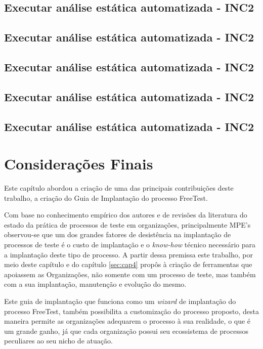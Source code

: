 \subsection{Executar análise estática automatizada - INC2}


\subsection{Executar análise estática automatizada - INC2}

\subsection{Executar análise estática automatizada - INC2}

\subsection{Executar análise estática automatizada - INC2}

\subsection{Executar análise estática automatizada - INC2}

\section{Considerações Finais}
\label{sec:consideracoesfinaisguiaimplantacao}

Este capítulo abordou a criação de uma das principais contribuições deste trabalho, a criação do Guia de Implantação do processo FreeTest. 

Com base no conhecimento empírico dos autores e de revisões da literatura do estado da prática de processos de teste em organizações, principalmente MPE’s observou-se que um dos grandes fatores de desistência na implantação de processos de teste é o custo de implantação e o \textit{know-how} técnico necessário para a implantação deste tipo de processo. A partir dessa premissa este trabalho, por meio deste capítulo e do capítulo \ref{sec:cap4} propôs à criação de ferramentas que apoiassem as Organizações, não somente com um processo de teste, mas também com a sua implantação, manutenção e evolução do mesmo. 

Este guia de implantação que funciona como um \textit{wizard} de implantação do processo FreeTest, também possibilita a customização do processo proposto, desta maneira permite as organizações adequarem o processo à sua realidade, o que é um grande ganho, já que cada organização possui seu ecossistema de processos peculiares ao seu nicho de atuação. 